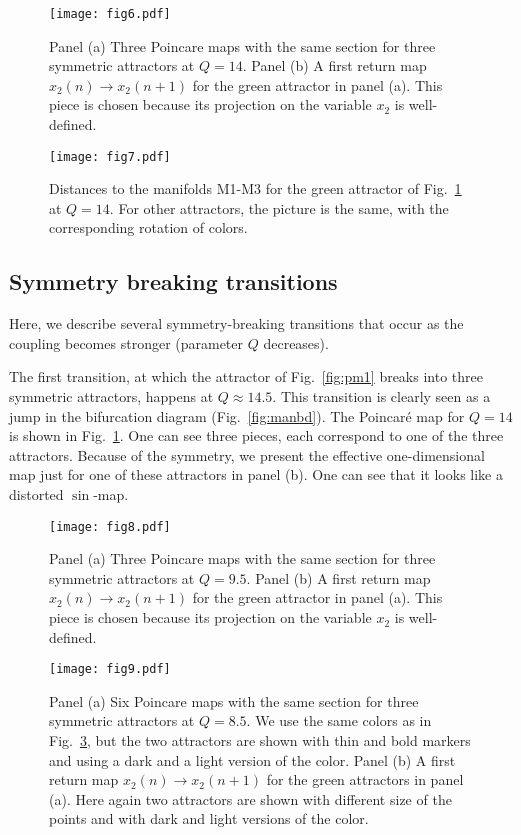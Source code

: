 \documentclass[3p,number,review,sort&compress]{elsarticle}
\begin{document}
\begin{figure}[!htb]
\centering
\texttt{[image: fig6.pdf]}
\caption{Panel (a) Three Poincare maps with the same section for three symmetric attractors
at $Q=14$. Panel (b) A first return map $x_2(n)\to  x_2(n+1)$ for the green attractor in panel (a).
 This piece is chosen because its projection
on the variable $x_2$ is well-defined.}
\label{fig:pm2}
\end{figure}

\begin{figure}[!htb]
\centering
\texttt{[image: fig7.pdf]}
\caption{Distances to the manifolds M1-M3 for the green attractor
of Fig.~\ref{fig:pm2} at $Q=14$. For other attractors, the picture is the same, with the corresponding rotation of colors.}
\label{fig:tr-dm2}
\end{figure}

\subsection{Symmetry breaking transitions} 

Here, we describe several symmetry-breaking transitions that occur as the coupling
becomes stronger (parameter $Q$ decreases). 

The first transition, at which the attractor of
Fig.~\ref{fig:pm1} breaks into three symmetric attractors, 
happens at $Q\approx 14.5$. This transition is clearly seen as a jump
in the bifurcation diagram (Fig.~\ref{fig:manbd}). 
The Poincar\'e map for $Q=14$ is shown in
Fig.~\ref{fig:pm2}. One can see three pieces, each correspond to one of the
three attractors. Because of the symmetry, we present the effective
one-dimensional map just for one of these attractors in panel (b).
One can see that it looks like a distorted $\sin$-map.

\begin{figure}[!htb]
\centering
\texttt{[image: fig8.pdf]}
\caption{Panel (a) Three Poincare maps with the same section for three symmetric attractors at $Q=9.5$. Panel (b) A first return 
map $x_2(n)\to x_2(n+1)$ for the green attractor in
panel (a). This piece is chosen because its projection
on the variable $x_2$ is well-defined.}
\label{fig:pm3}
\end{figure}



\begin{figure}[!htb]
\centering
\texttt{[image: fig9.pdf]}
\caption{Panel (a) Six Poincare maps with the 
same section for three symmetric attractors at $Q=8.5$. 
We use the same colors as in Fig.~\ref{fig:pm3}, but the two attractors
are shown with thin and bold markers and using a dark and a light version of the color.
Panel (b) A first return 
map $x_2(n)\to x_2(n+1)$ for the green attractors in
panel (a). Here again two attractors are shown with different size of the points
and with dark and light versions of the color.}
\label{fig:pm4}
\end{figure}
\end{document}
